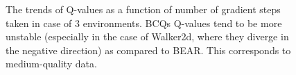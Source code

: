 \begin{figure}[h]
\begin{subfigure}[h]{0.31\textwidth}
    \end{subfigure}%
    \caption{The trends of Q-values as a function of number of gradient steps taken in case of 3 environments. BCQs Q-values tend to be more unstable (especially in the case of Walker2d, where they diverge in the negative direction) as compared to BEAR. This corresponds to medium-quality data.}
    \label{fig:q_val_mediocre}
\end{figure}




